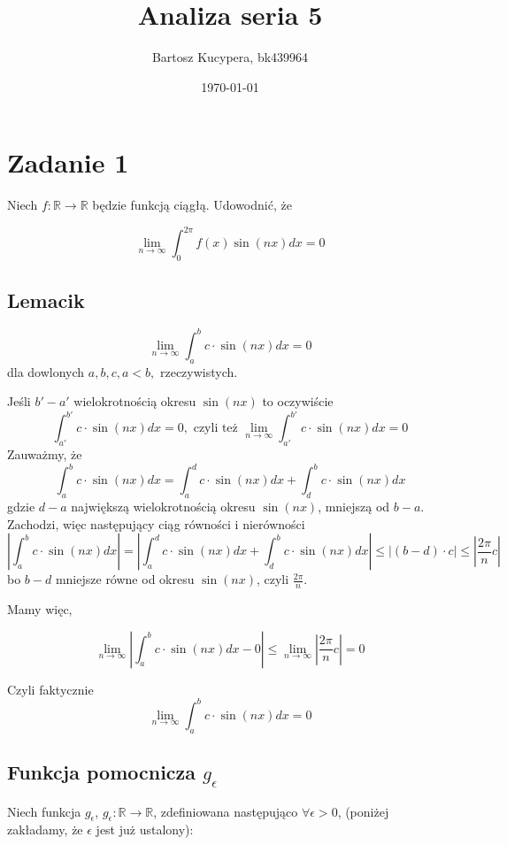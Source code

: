 \documentclass{article}
\title{Analiza seria 5}
\author{Bartosz Kucypera, bk439964}
\date{\today}
\begin{document}
\maketitle

\section*{Zadanie 1}

Niech $\displaystyle f : \mathbb{R} \to \mathbb{R} $ będzie funkcją ciągłą. Udowodnić, że

$$\lim_{n \to \infty} \int_{0}^{2\pi} f(x)\sin(nx)dx = 0$$

\subsection*{Lemacik}
$$\lim_{n\to \infty} \int_a^bc \cdot \sin(nx)dx = 0$$
dla dowlonych $a, b, c, a<b,$ rzeczywistych.

Jeśli $b' - a'$ wielokrotnością okresu $\sin(nx)$ to oczywiście
$$ \int_{a'}^{b'} c \cdot \sin(nx)dx = 0, \mbox{ czyli też } \lim_{n\to\infty}\int_{a'}^{b'}c \cdot \sin(nx)dx = 0$$
Zauważmy, że
$$\int_a^bc \cdot \sin(nx)dx = \int_{a}^{d} c \cdot \sin(nx)dx + \int_{d}^{b}c \cdot \sin(nx)dx $$
gdzie $d-a$ największą wielokrotnością okresu $\sin(nx)$, mniejszą od $b-a$.
Zachodzi, więc następujący ciąg równości i nierówności
$$\left|\int_a^b c \cdot \sin(nx)dx \right|= \left|\int_a^d c \cdot \sin(nx)dx + \int_d^b c \cdot \sin(nx)dx \right|
\le \left|(b-d)\cdot c \right|\le \left|\frac{2\pi}{n}c \right|$$
bo $b-d$ mniejsze równe od okresu $\sin(nx)$, czyli $\frac{2\pi}{n}$. \newline

Mamy więc, 

$$\lim_{n\to \infty} \left| \int_a^bc\cdot\sin(nx)dx - 0 \right| \le
\lim_{n\to\infty} \left| \frac{2\pi}{n}c \right| = 0 $$

Czyli faktycznie 
$$\lim_{n\to\infty}\int_a^bc\cdot \sin(nx)dx = 0$$

\newpage

\subsection*{Funkcja pomocnicza $g_{\epsilon}$}


Niech funkcja $g_{\epsilon}$, $g_{\epsilon}: \mathbb{R} \to \mathbb{R}$, zdefiniowana następująco $\forall \epsilon >0$, (poniżej zakładamy, że $\epsilon$ jest już ustalony):
\end{document}
